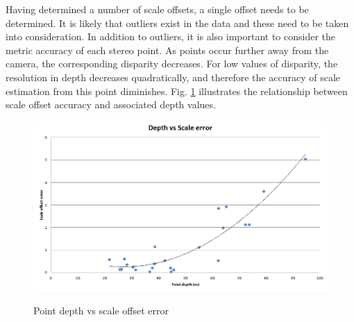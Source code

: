 Having determined a number of scale offsets, a single offset needs to be determined.  It is likely that outliers exist in the data and these need to be taken into consideration.  In addition to outliers, it is also important to consider the metric accuracy of each stereo point.  As points occur further away from the camera, the corresponding disparity decreases.  For low values of disparity, the resolution in depth decreases quadratically, and therefore the accuracy of scale estimation from this point diminishes. Fig. \ref{fig:scale_bar_graph} illustrates the relationship between scale offset accuracy and associated depth values.
\begin{figure}[h]
  \centering
    \includegraphics[width=1.0\textwidth]{chapters/images/distance_vs_scale_error}\\
  \caption{Point depth vs scale offset error}
  \label{fig:scale_bar_graph}
\end{figure}




